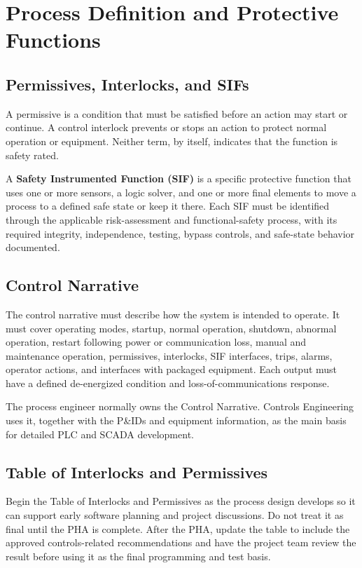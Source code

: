 \chapter{Process Definition and Protective Functions}
\section{Permissives, Interlocks, and SIFs}
A permissive is a condition that must be satisfied before an action may start or continue. A control interlock prevents or stops an action to protect normal operation or equipment. Neither term, by itself, indicates that the function is safety rated.

A \textbf{Safety Instrumented Function (SIF)} is a specific protective function that uses one or more sensors, a logic solver, and one or more final elements to move a process to a defined safe state or keep it there. Each SIF must be identified through the applicable risk-assessment and functional-safety process, with its required integrity, independence, testing, bypass controls, and safe-state behavior documented.

\section{Control Narrative}
The control narrative must describe how the system is intended to operate. It must cover operating modes, startup, normal operation, shutdown, abnormal operation, restart following power or communication loss, manual and maintenance operation, permissives, interlocks, SIF interfaces, trips, alarms, operator actions, and interfaces with packaged equipment. Each output must have a defined de-energized condition and loss-of-communications response.

The process engineer normally owns the Control Narrative. Controls Engineering uses it, together with the P\&IDs and equipment information, as the main basis for detailed PLC and SCADA development.

\section{Table of Interlocks and Permissives}
Begin the Table of Interlocks and Permissives as the process design develops so it can support early software planning and project discussions. Do not treat it as final until the PHA is complete. After the PHA, update the table to include the approved controls-related recommendations and have the project team review the result before using it as the final programming and test basis.

